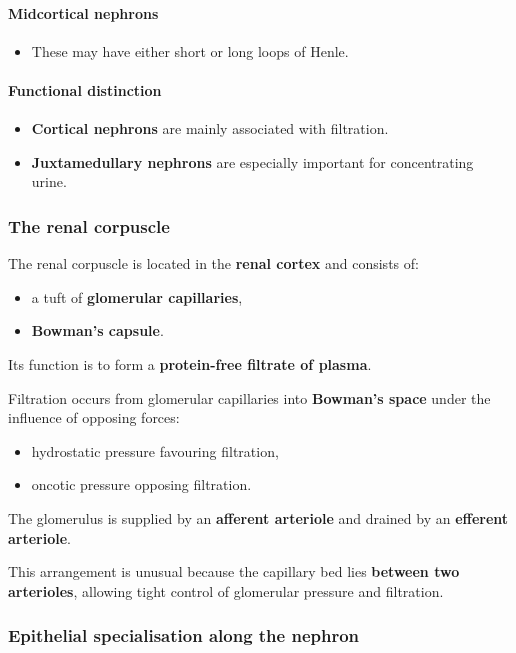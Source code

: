 \documentclass[11pt,a4paper]{article}
\begin{document}
\paragraph{Midcortical nephrons}
\begin{itemize}
    \item These may have either short or long loops of Henle.
\end{itemize}

\paragraph{Functional distinction}
\begin{itemize}
    \item \textbf{Cortical nephrons} are mainly associated with filtration.
    \item \textbf{Juxtamedullary nephrons} are especially important for concentrating urine.
\end{itemize}

\subsubsection{The renal corpuscle}

The renal corpuscle is located in the \textbf{renal cortex} and consists of:
\begin{itemize}
    \item a tuft of \textbf{glomerular capillaries},
    \item \textbf{Bowman's capsule}.
\end{itemize}

Its function is to form a \textbf{protein-free filtrate of plasma}.

Filtration occurs from glomerular capillaries into \textbf{Bowman's space} under the influence of opposing forces:
\begin{itemize}
    \item hydrostatic pressure favouring filtration,
    \item oncotic pressure opposing filtration.
\end{itemize}

The glomerulus is supplied by an \textbf{afferent arteriole} and drained by an \textbf{efferent arteriole}.

This arrangement is unusual because the capillary bed lies \textbf{between two arterioles}, allowing tight control of glomerular pressure and filtration.

\subsubsection{Epithelial specialisation along the nephron}
\end{document}

